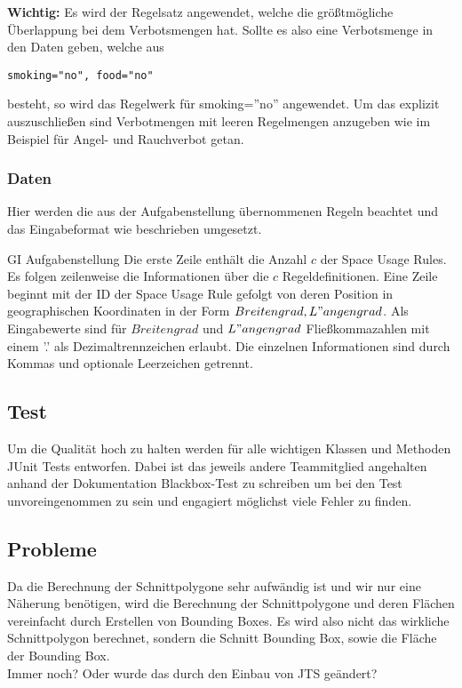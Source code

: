 \textbf{Wichtig:} Es wird der Regelsatz angewendet, welche die größtmögliche Überlappung bei dem Verbotsmengen hat.
Sollte es also eine Verbotsmenge in den Daten geben, welche aus \begin{lstlisting}[frame=single]
smoking="no", food="no"
\end{lstlisting}
besteht, so wird das Regelwerk für smoking=''no'' angewendet. Um das explizit auszuschließen sind Verbotmengen mit leeren Regelmengen anzugeben
wie im Beispiel für Angel- und Rauchverbot getan.

\subsubsection{Daten}
\label{sec:Eingabedaten_GI}
Hier werden die aus der Aufgabenstellung übernommenen Regeln beachtet und das Eingabeformat wie beschrieben umgesetzt.
\begin{aquote}{GI Aufgabenstellung}
Die erste Zeile enthält die Anzahl $c$ der Space Usage Rules. Es folgen zeilenweise die Informationen
über die $c$ Regeldefinitionen.
Eine Zeile beginnt mit der ID der Space Usage Rule gefolgt von deren Position in geographischen
Koordinaten in der Form $Breitengrad, L"angengrad$. Als Eingabewerte sind für $Breitengrad$ und
$L"angengrad$ Fließkommazahlen mit einem ’.’ als Dezimaltrennzeichen erlaubt. Die einzelnen Informationen
sind durch Kommas und optionale Leerzeichen getrennt.
\end{aquote}

\subsection{Test}
Um die Qualität hoch zu halten werden für alle wichtigen Klassen und Methoden JUnit Tests
entworfen. Dabei ist das jeweils andere Teammitglied angehalten anhand der Dokumentation Blackbox-Test zu
schreiben um bei den Test unvoreingenommen zu sein und engagiert möglichst viele Fehler zu finden.

\subsection{Probleme}
Da die Berechnung der Schnittpolygone sehr aufwändig ist und wir nur eine Näherung benötigen,
wird die Berechnung der Schnittpolygone und deren Flächen vereinfacht durch Erstellen von Bounding Boxes.
Es wird also nicht das wirkliche Schnittpolygon berechnet, sondern die Schnitt Bounding Box, sowie die Fläche der Bounding Box.
\\Immer noch? Oder wurde das durch den Einbau von JTS geändert?
